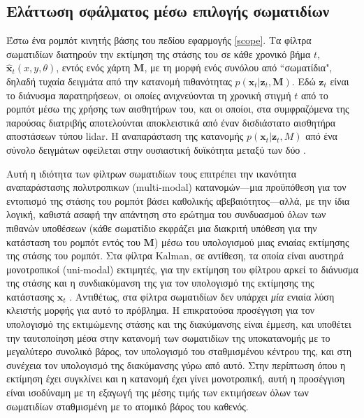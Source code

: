 \subsection{Ελάττωση σφάλματος μέσω επιλογής σωματιδίων}

Έστω ένα ρομπότ κινητής βάσης του πεδίου εφαρμογής \ref{scope}. Τα φίλτρα
σωματιδίων διατηρούν την εκτίμηση της στάσης του σε κάθε χρονικό βήμα
$t$, $\hat{\bm{x}}_t (x, y, \theta)$, εντός ενός χάρτη $\bm{M}$, με τη μορφή
ενός συνόλου από ``σωματίδια", δηλαδή τυχαία δειγμάτα από την κατανομή
πιθανότητας $p(\bm{x}_t | \bm{z}_t, \bm{M})$. Εδώ $\bm{z}_t$ είναι το διάνυσμα
παρατηρήσεων, οι οποίες ανιχνεύονται τη χρονική στιγμή $t$ από το ρομπότ μέσω
της χρήσης των αισθητήρων του, και οι οποίοι, στα συμφραζόμενα της παρούσας
διατριβής αποτελούνται αποκλειστικά από έναν δισδιάστατο αισθητήρα αποστάσεων
τύπου lidar. H αναπαράσταση της κατανομής $p(\bm{x}_t | \bm{z}_t, M)$ από ένα
σύνολο δειγμάτων οφείλεται στην ουσιαστική δυϊκότητα μεταξύ των δύο
\cite{Smith1992}.

Αυτή η ιδιότητα των φίλτρων σωματιδίων τους επιτρέπει την ικανότητα
αναπαράστασης πολυτροπικων (multi-modal) κατανομών---μια προϋπόθεση για τον
εντοπισμό της στάσης του ρομπότ βάσει καθολικής αβεβαιότητος---αλλά, με την
ίδια λογική, καθιστά ασαφή την απάντηση στο ερώτημα του συνδυασμού όλων των
πιθανών υποθέσεων (κάθε σωματίδιο εκφράζει μια διακριτή υπόθεση για την
κατάσταση του ρομπότ εντός του $\bm{M}$) μέσω του υπολογισμού μιας ενιαίας
εκτίμησης της στάσης του ρομπότ. Στα φίλτρα Kalman, σε αντίθεση, τα οποία είναι
αυστηρά μονοτροπικoί (uni-modal) εκτιμητές, για την εκτίμηση του φίλτρου αρκεί
το διάνυσμα της στάσης και η συνδιακύμανση της για τον υπολογισμό της εκτίμησης
της κατάστασης $\bm{x}_t$ \cite{Maybeck1979}. Αντιθέτως, στα φίλτρα σωματιδίων
δεν υπάρχει \textit{μία} ενιαία λύση κλειστής μορφής για αυτό το πρόβλημα. Η
επικρατούσα προσέγγιση για τον υπολογισμό της εκτιμώμενης στάσης και της
διακύμανσης είναι έμμεση, και υποθέτει την ταυτοποίηση μέσα στην κατανομή των
σωματιδίων της υποκατανομής με το μεγαλύτερο συνολικό βάρος, τον υπολογισμό
του σταθμισμένου κέντρου της, και στη συνέχεια τον υπολογισμό της διακύμανσης
γύρω από αυτό.  Στην περίπτωση όπου η εκτίμηση έχει συγκλίνει και η κατανομή
έχει γίνει μονοτροπική, αυτή η προσέγγιση είναι ισοδύναμη με τη εξαγωγή της
μέσης τιμής των εκτιμήσεων όλων των σωματιδίων σταθμισμένη με το ατομικό βάρος
του καθενός.

